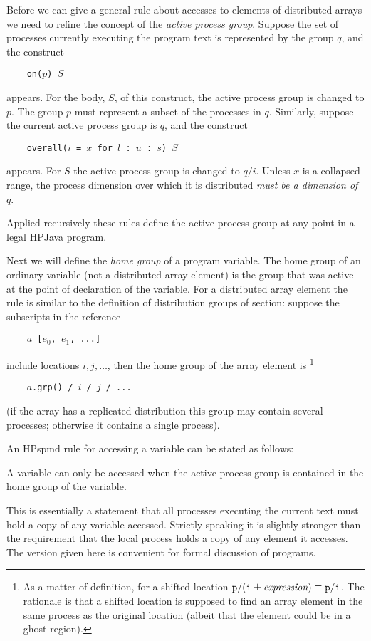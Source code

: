 \documentclass{article}
\begin{document}
Before we can give a general rule about accesses to elements
of distributed arrays we need to refine the concept of the
{\em active process group}.  Suppose the set of processes currently executing
the program text is represented by the group $q$, and the construct
\small
\begin{tabbing}
\verb$    on($$p$\verb$) $$S$
\end{tabbing}
\normalsize
appears.  For the body, $S$, of this construct, the active process group is
changed to $p$.  The group $p$ must represent a subset of the processes
in $q$.
Similarly, suppose the current active process group is $q$, and the
construct 
\small
\begin{tabbing}
\verb$    overall($$i$\verb$ = $$x$\verb$ for $$l$\verb$ : $$u$\verb$ : $$s$\verb$) $$S$
\end{tabbing}
\normalsize
appears.  For $S$ the active process group is changed to $q / i$.
Unless $x$ is a collapsed range, the process dimension over which it
is distributed {\em must be a dimension of $q$}.

Applied recursively these rules define the active process group at any
point in a legal HPJava program.

Next we will define the {\em home group} of a program variable.
The home group of an ordinary variable (not a distributed array element) is
the group that was active at the point of declaration of the variable.
For a distributed array element the rule is similar to the definition of
distribution groups of section: suppose the subscripts in the reference
\small
\begin{tabbing}
\verb$    $$a$\verb$ [$$e_0$\verb$, $$e_1$\verb$, ...]$
\end{tabbing}
\normalsize
include locations $i, j, \ldots$, then the home group of the array
element is%
\footnote{As a matter of definition, for a shifted location
$\mbox{\tt p} / (\mbox{\tt i} \pm \mbox{\em expression}) \equiv
\mbox{\tt p} / \mbox{\tt i}$.
The rationale is that a shifted location is supposed to find an array
element in the same process as the original location (albeit that
the element could be in a ghost region).}
\small
\begin{tabbing}
\verb$    $$a$\verb$.grp() / $$i$\verb$ / $$j$\verb$ / ...$
\end{tabbing}
\normalsize
(if the array has a replicated distribution this group may contain
several processes; otherwise it contains a single process).

An HPspmd rule for accessing a variable can be stated as follows:
\begin{usageRule}
A variable can only be accessed when the active process
group is contained in the home group of the variable.
\end{usageRule}
This is essentially a statement that all processes executing the
current text must hold a copy of any variable accessed.
Strictly speaking it is slightly stronger than the requirement that 
the local process holds a copy of any element it accesses.
The version given here is convenient for formal discussion of
programs.
\end{document}
